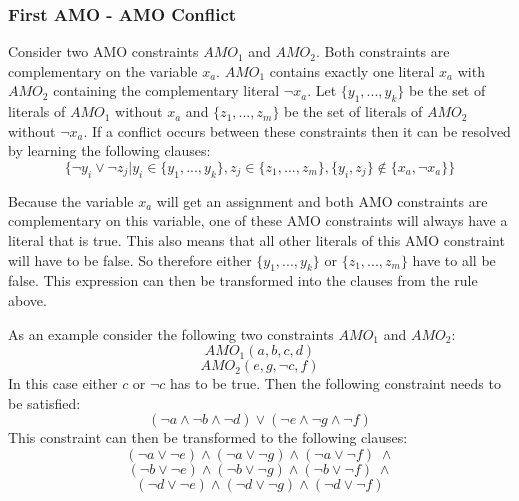 \subsubsection{First AMO - AMO Conflict}
\begin{leftbar}
Consider two AMO constraints $AMO_1$ and $AMO_2$. Both constraints are complementary on the variable $x_a$. $AMO_1$ contains exactly one literal $x_a$ with $AMO_2$ containing the complementary literal $\neg x_a$. Let $\{y_1,...,y_k\}$ be the set of literals of $AMO_1$ without $x_a$ and $\{z_1,...,z_m\}$ be the set of literals of $AMO_2$ without $\neg x_a$. 
If a conflict occurs between these constraints then it can be resolved by learning the following clauses:
\begin{displaymath}
\{\neg y_i \vee \neg z_j | y_i \in \{y_1,...,y_k\}, z_j \in \{z_1,...,z_m\}, \{y_i,z_j\} \not\in \{x_a, \neg x_a\}\}
\end{displaymath}

\end{leftbar}
Because the variable $x_a$ will get an assignment and both AMO constraints are complementary on this variable, one of these AMO constraints will always have a literal that is true. This also means that all other literals of this AMO constraint will have to be false. So therefore either $\{y_1,...,y_k\}$ or $\{z_1,...,z_m\}$ have to all be false. This expression can then be transformed into the clauses from the rule above.

As an example consider the following two constraints $AMO_1$ and $AMO_2$:
\begin{displaymath}
AMO_1(a,b,c,d)
\end{displaymath}
\begin{displaymath}
AMO_2(e,g,\neg c,f)
\end{displaymath}
In this case either $c$ or $\neg c$ has to be true. Then the following constraint needs to be satisfied:
\begin{displaymath}
(\neg a \wedge \neg b \wedge \neg d) \vee (\neg e \wedge \neg g \wedge \neg f)
\end{displaymath}
This constraint can then be transformed to the following clauses:
\begin{displaymath}
(\neg a \vee \neg e) \wedge (\neg a \vee \neg g) \wedge (\neg a \vee \neg f) \; \wedge
\end{displaymath}
\begin{displaymath}
(\neg b \vee \neg e) \wedge (\neg b \vee \neg g) \wedge (\neg b \vee \neg f) \; \wedge
\end{displaymath}
\begin{displaymath}
(\neg d \vee \neg e) \wedge (\neg d \vee \neg g) \wedge (\neg d \vee \neg f)
\end{displaymath}


